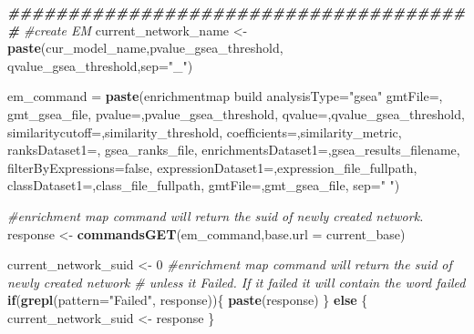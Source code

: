\documentclass[
]{book}
\newenvironment{Shaded}{\begin{snugshade}}{\end{snugshade}}
\newcommand{\AttributeTok}[1]{\textcolor[rgb]{0.13,0.29,0.53}{#1}}
\newcommand{\CommentTok}[1]{\textcolor[rgb]{0.56,0.35,0.01}{\textit{#1}}}
\newcommand{\ControlFlowTok}[1]{\textcolor[rgb]{0.13,0.29,0.53}{\textbf{#1}}}
\newcommand{\DecValTok}[1]{\textcolor[rgb]{0.00,0.00,0.81}{#1}}
\newcommand{\DocumentationTok}[1]{\textcolor[rgb]{0.56,0.35,0.01}{\textbf{\textit{#1}}}}
\newcommand{\FunctionTok}[1]{\textcolor[rgb]{0.13,0.29,0.53}{\textbf{#1}}}
\newcommand{\NormalTok}[1]{#1}
\newcommand{\OtherTok}[1]{\textcolor[rgb]{0.56,0.35,0.01}{#1}}
\newcommand{\StringTok}[1]{\textcolor[rgb]{0.31,0.60,0.02}{#1}}
\begin{document}
\begin{Shaded}
\begin{Highlighting}[]
\DocumentationTok{\#\#\#\#\#\#\#\#\#\#\#\#\#\#\#\#\#\#\#\#\#\#\#\#\#\#\#\#\#\#\#\#\#\#\#\#\#\#\#}
\CommentTok{\#create EM}
\NormalTok{current\_network\_name }\OtherTok{\textless{}{-}} \FunctionTok{paste}\NormalTok{(cur\_model\_name,pvalue\_gsea\_threshold,}
\NormalTok{                              qvalue\_gsea\_threshold,}\AttributeTok{sep=}\StringTok{"\_"}\NormalTok{)}

\NormalTok{em\_command }\OtherTok{=} \FunctionTok{paste}\NormalTok{(}\StringTok{\textquotesingle{}enrichmentmap build analysisType="gsea" gmtFile=\textquotesingle{}}\NormalTok{,}
\NormalTok{                                                              gmt\_gsea\_file,}
                   \StringTok{\textquotesingle{}pvalue=\textquotesingle{}}\NormalTok{,pvalue\_gsea\_threshold, }
                   \StringTok{\textquotesingle{}qvalue=\textquotesingle{}}\NormalTok{,qvalue\_gsea\_threshold,}
                   \StringTok{\textquotesingle{}similaritycutoff=\textquotesingle{}}\NormalTok{,similarity\_threshold,}
                   \StringTok{\textquotesingle{}coefficients=\textquotesingle{}}\NormalTok{,similarity\_metric,}
                   \StringTok{\textquotesingle{}ranksDataset1=\textquotesingle{}}\NormalTok{, gsea\_ranks\_file,}
                   \StringTok{\textquotesingle{}enrichmentsDataset1=\textquotesingle{}}\NormalTok{,gsea\_results\_filename, }
                   \StringTok{\textquotesingle{}filterByExpressions=false\textquotesingle{}}\NormalTok{,}
                   \StringTok{\textquotesingle{}expressionDataset1=\textquotesingle{}}\NormalTok{,expression\_file\_fullpath,}
                   \StringTok{\textquotesingle{}classDataset1=\textquotesingle{}}\NormalTok{,class\_file\_fullpath,}
                   \StringTok{\textquotesingle{}gmtFile=\textquotesingle{}}\NormalTok{,gmt\_gsea\_file,}
                   \AttributeTok{sep=}\StringTok{" "}\NormalTok{)}

\CommentTok{\#enrichment map command will return the suid of newly created network.}
\NormalTok{response }\OtherTok{\textless{}{-}} \FunctionTok{commandsGET}\NormalTok{(em\_command,}\AttributeTok{base.url =}\NormalTok{ current\_base)}

\NormalTok{current\_network\_suid }\OtherTok{\textless{}{-}} \DecValTok{0}
\CommentTok{\#enrichment map command will return the suid of newly created network }
\CommentTok{\# unless it Failed.  If it failed it will contain the word failed}
\ControlFlowTok{if}\NormalTok{(}\FunctionTok{grepl}\NormalTok{(}\AttributeTok{pattern=}\StringTok{"Failed"}\NormalTok{, response))\{}
  \FunctionTok{paste}\NormalTok{(response)}
\NormalTok{\} }\ControlFlowTok{else}\NormalTok{ \{}
\NormalTok{  current\_network\_suid }\OtherTok{\textless{}{-}}\NormalTok{ response}
\NormalTok{\}}


\end{Highlighting}
\end{Shaded}
\end{document}
